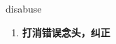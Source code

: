 
\begin{frame}
{\huge disabuse}
\begin{center}
\begin{enumerate}\Large
  \item \textbf{打消错误念头，纠正}
\end{enumerate}
\end{center}
\end{frame}
